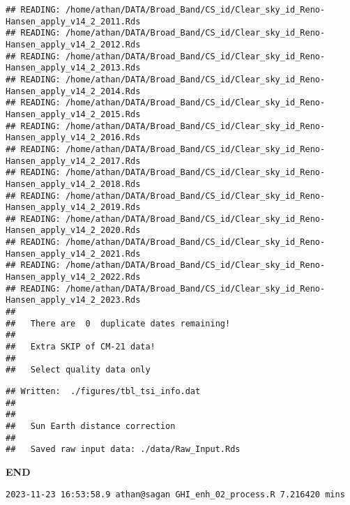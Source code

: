\documentclass[
  10pt,
  a4paper,oneside]{article}
\begin{document}
\begin{verbatim}
## READING: /home/athan/DATA/Broad_Band/CS_id/Clear_sky_id_Reno-Hansen_apply_v14_2_2011.Rds 
## READING: /home/athan/DATA/Broad_Band/CS_id/Clear_sky_id_Reno-Hansen_apply_v14_2_2012.Rds 
## READING: /home/athan/DATA/Broad_Band/CS_id/Clear_sky_id_Reno-Hansen_apply_v14_2_2013.Rds 
## READING: /home/athan/DATA/Broad_Band/CS_id/Clear_sky_id_Reno-Hansen_apply_v14_2_2014.Rds 
## READING: /home/athan/DATA/Broad_Band/CS_id/Clear_sky_id_Reno-Hansen_apply_v14_2_2015.Rds 
## READING: /home/athan/DATA/Broad_Band/CS_id/Clear_sky_id_Reno-Hansen_apply_v14_2_2016.Rds 
## READING: /home/athan/DATA/Broad_Band/CS_id/Clear_sky_id_Reno-Hansen_apply_v14_2_2017.Rds 
## READING: /home/athan/DATA/Broad_Band/CS_id/Clear_sky_id_Reno-Hansen_apply_v14_2_2018.Rds 
## READING: /home/athan/DATA/Broad_Band/CS_id/Clear_sky_id_Reno-Hansen_apply_v14_2_2019.Rds 
## READING: /home/athan/DATA/Broad_Band/CS_id/Clear_sky_id_Reno-Hansen_apply_v14_2_2020.Rds 
## READING: /home/athan/DATA/Broad_Band/CS_id/Clear_sky_id_Reno-Hansen_apply_v14_2_2021.Rds 
## READING: /home/athan/DATA/Broad_Band/CS_id/Clear_sky_id_Reno-Hansen_apply_v14_2_2022.Rds 
## READING: /home/athan/DATA/Broad_Band/CS_id/Clear_sky_id_Reno-Hansen_apply_v14_2_2023.Rds 
## 
##   There are  0  duplicate dates remaining!
## 
##   Extra SKIP of CM-21 data!
## 
##   Select quality data only
\end{verbatim}

\begin{verbatim}
## Written:  ./figures/tbl_tsi_info.dat 
## 
## 
##   Sun Earth distance correction
## 
##   Saved raw input data: ./data/Raw_Input.Rds
\end{verbatim}

\textbf{END}

\begin{verbatim}
2023-11-23 16:53:58.9 athan@sagan GHI_enh_02_process.R 7.216420 mins
\end{verbatim}
\end{document}
